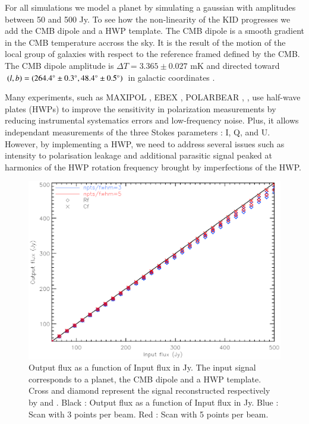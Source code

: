 For all simulations we model a planet by simulating a gaussian with amplitudes between 50 and 500 Jy. To see how the non-linearity of the KID progresses we add the CMB dipole and a HWP template. The CMB dipole is a smooth gradient in the CMB temperature accross the sky. It is the result of the motion of the local group of galaxies with respect to the reference framed defined by the CMB. The CMB dipole amplitude is $\Delta T = 3.365 \pm 0.027$ mK and directed toward $(l,b) = (264.4 \degree \pm 0.3 \degree , 48.4 \degree \pm 0.5 \degree)$ in galactic coordinates \citep{2015IJMPD..2430004B}. 

Many experiments, such as MAXIPOL \citep{2007ApJ...665...42J}, EBEX \citep{2010SPIE.7741E..1CR}, POLARBEAR \citep{2017JCAP...05..008T},  \citep{2017A&A...599A..34R}, use half-wave plates (HWPs) to improve the sensitivity in polarization measurements by reducing instrumental systematics errors and low-frequency noise. Plus, it allows independant measurements of the three Stokes parameters : I, Q, and U. However, by implementing a HWP, we need to address several issues such as intensity to polarisation leakage and additional parasitic signal peaked at harmonics of the HWP rotation frequency brought by imperfections of the HWP. 

\begin{figure}[h]
\center
	\includegraphics[scale=0.5]{Figures/NL-planet-hwp-dipole.eps}
	\caption{Output flux as a function of Input flux in Jy. 
	The input signal corresponds to a planet, the CMB dipole and a HWP template. Cross and diamond represent the signal reconstructed respectively by \cf and \rf. Black : Output flux as a function of Input flux in Jy. Blue : Scan with 3 points per beam. Red : Scan with 5 points per beam.}
	\label{fig:nl-planet-hwp-dipole}
\end{figure}

